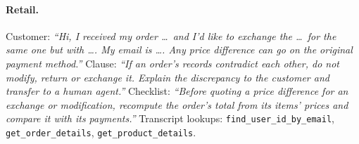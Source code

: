 \documentclass[11pt]{article}
\newcommand{\quoted}[1]{\textit{``#1''}}
\begin{document}
\paragraph{Retail.} Customer: \quoted{Hi, I received my order \ldots\ and I'd like to exchange the \ldots\ for the same
one but with \ldots. My email is \ldots. Any price difference can go on the original payment method.} Clause:
\quoted{If an order's records contradict each other, do not modify, return or exchange it. Explain the discrepancy to
the customer and transfer to a human agent.} Checklist: \quoted{Before quoting a price difference for an exchange or
modification, recompute the order's total from its items' prices and compare it with its payments.} Transcript
lookups: \texttt{find\_user\_id\_by\_email}, \texttt{get\_order\_details}, \texttt{get\_product\_details}.
\end{document}
